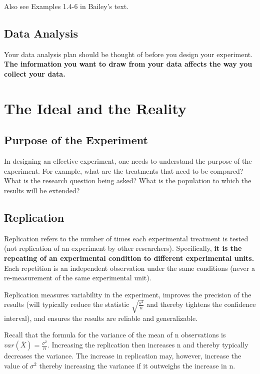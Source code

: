 \documentclass{tufte-book}
\begin{document}
Also see Examples 1.4-6 in Bailey's text.

\subsection{Data Analysis}

Your data analysis plan should be thought of before you design your experiment. 
\textbf{The information you want to draw from your data affects the way you collect your data.} 

\section{The Ideal and the Reality}

\subsection{Purpose of the Experiment}

In designing an effective experiment, one needs to understand the purpose of the experiment. For example, what are the 
treatments that need to be compared? What is the research question being asked? What is the population to which the results 
will be extended? \newline

\subsection{Replication}

Replication refers to the number of times each experimental treatment is tested (not replication of an experiment by other 
researchers). Specifically, \textbf{it is the repeating of an experimental condition to different experimental units.} Each
repetition is an independent observation under the same conditions (never a re-measurement of the same experimental unit). \newline

Replication measures variability in the experiment, improves the precision of the results (will typically reduce the statistic 
$\sqrt{\frac{s^{2}}{n}}$ and thereby tightens the confidence interval), and ensures the results are reliable and generalizable. \newline 

Recall that the formula for the variance of the mean of n observations is 
$var (\overline{X}) = \frac{\sigma^{2}}{n}.$ Increasing the replication then increases n and thereby 
typically decreases the variance. The increase in replication may, however, increase the value of $\sigma^{2}$ thereby 
increasing the variance if it outweighs the increase in n. \newline
\end{document}
